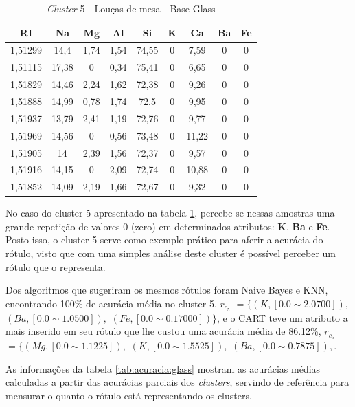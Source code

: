 \begin{table}[!h]
\centering
\caption{\textit{Cluster} 5 - Louças de mesa - Base Glass }
\label{tab:glass:cluster5}
\begin{tabular}{c|c|c|c|c|c|c|c|c}
\hline
\textbf{RI} & \textbf{Na} & \textbf{Mg} & \textbf{Al} & \textbf{Si} & \textbf{K} & \textbf{Ca} & \textbf{Ba} & \textbf{Fe}\\ \hline 
1,51299 & 14,4 & 1,74 & 1,54 & 74,55 & 0 & 7,59 & 0 & 0\\ 
1,51115 & 17,38 & 0 & 0,34 & 75,41 & 0 & 6,65 & 0 & 0\\ 
1,51829 & 14,46 & 2,24 & 1,62 & 72,38 & 0 & 9,26 & 0 & 0\\ 
1,51888 & 14,99 & 0,78 & 1,74 & 72,5 & 0 & 9,95 & 0 & 0\\ 
1,51937 & 13,79 & 2,41 & 1,19 & 72,76 & 0 & 9,77 & 0 & 0\\ 
1,51969 & 14,56 & 0 & 0,56 & 73,48 & 0 & 11,22 & 0 & 0\\ 
1,51905 & 14 & 2,39 & 1,56 & 72,37 & 0 & 9,57 & 0 & 0\\ 
1,51916 & 14,15 & 0 & 2,09 & 72,74 & 0 & 10,88 & 0 & 0\\ 
1,51852 & 14,09 & 2,19 & 1,66 & 72,67 & 0 & 9,32 & 0 & 0\\ 

    
\end{tabular}
\end{table}

No caso do cluster 5 apresentado na tabela \ref{tab:glass:cluster5}, percebe-se nessas amostras  uma grande repetição de valores 0 (zero) em determinados atributos:  \textbf{K}, \textbf{Ba} e \textbf{Fe}. Posto isso, o cluster 5 serve como exemplo prático para aferir a acurácia do rótulo, visto que com uma simples análise deste cluster é possível perceber um rótulo que o representa. 

Dos algoritmos que sugeriram os mesmos rótulos foram Naive Bayes e KNN, encontrando  100\% de acurácia média no cluster 5, ${r_{c_5}}$ ${=\{ (K,[ 0.0 \sim  2.0700 ] ),}$ ${(Ba,[ 0.0 \sim 1.0500 ] ),}$ ${(Fe,[ 0.0 \sim 0.17000] ) \} }$, e o CART teve um atributo a mais inserido em seu rótulo que lhe custou uma acurácia média de 86.12\%, ${r_{c_5}}$ ${=\{ (Mg,[ 0.0 \sim  1.1225 ] ),}$ ${(K,[ 0.0 \sim 1.5525 ]  ),}$ ${(Ba,[ 0.0 \sim 0.7875 ] ), }$. 

As informações da tabela \ref{tab:acuracia:glass} mostram as acurácias médias calculadas a partir das acurácias parciais dos \textit{clusters}, servindo de referência para  mensurar o quanto o rótulo está representando os clusters.

